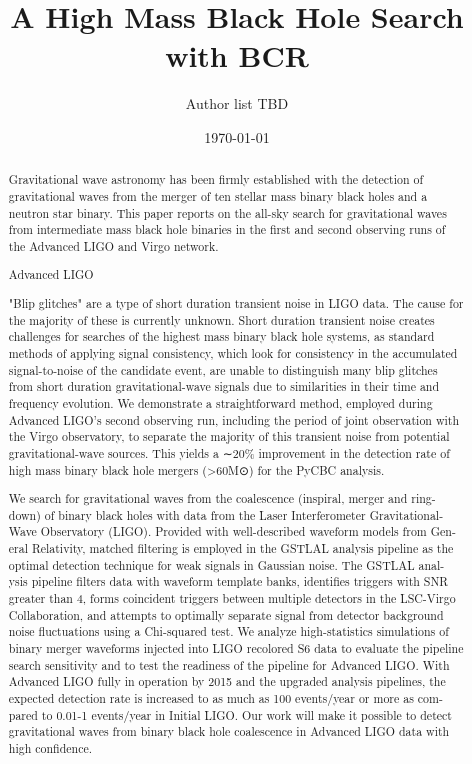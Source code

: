 \documentclass[%
 reprint,
 amsmath,amssymb,
 aps,
]{revtex4-2}
\begin{document}

\title{A High Mass Black Hole Search\\with BCR}%


\author{Author list TBD}

\date{\today}

\begin{abstract}


Gravitational wave astronomy has been firmly established with the detection of gravitational waves from the merger of ten stellar mass binary black holes and a neutron star binary. This paper reports on the all-sky search for gravitational waves from intermediate mass black hole binaries in the first and second observing runs of the Advanced LIGO and Virgo network.

Advanced LIGO

"Blip glitches" are a type of short duration transient noise in LIGO data. The cause for the majority of these is currently unknown. Short duration transient noise creates challenges for searches of the highest mass binary black hole systems, as standard methods of applying signal consistency, which look for consistency in the accumulated signal-to-noise of the candidate event, are unable to distinguish many blip glitches from short duration gravitational-wave signals due to similarities in their time and frequency evolution. We demonstrate a straightforward method, employed during Advanced LIGO's second observing run, including the period of joint observation with the Virgo observatory, to separate the majority of this transient noise from potential gravitational-wave sources. This yields a ∼20\% improvement in the detection rate of high mass binary black hole mergers (>60M⊙) for the PyCBC analysis.

We search for gravitational waves from the coalescence (inspiral, merger and ring- down) of binary black holes with data from the Laser Interferometer Gravitational- Wave Observatory (LIGO). Provided with well-described waveform models from Gen- eral Relativity, matched filtering is employed in the GSTLAL analysis pipeline as the optimal detection technique for weak signals in Gaussian noise. The GSTLAL anal- ysis pipeline filters data with waveform template banks, identifies triggers with SNR greater than 4, forms coincident triggers between multiple detectors in the LSC-Virgo Collaboration, and attempts to optimally separate signal from detector background noise fluctuations using a Chi-squared test. We analyze high-statistics simulations of binary merger waveforms injected into LIGO recolored S6 data to evaluate the pipeline search sensitivity and to test the readiness of the pipeline for Advanced LIGO. With Advanced LIGO fully in operation by 2015 and the upgraded analysis pipelines, the expected detection rate is increased to as much as 100 events/year or more as com- pared to 0.01-1 events/year in Initial LIGO. Our work will make it possible to detect gravitational waves from binary black hole coalescence in Advanced LIGO data with high confidence.


\end{abstract}
\end{document}

